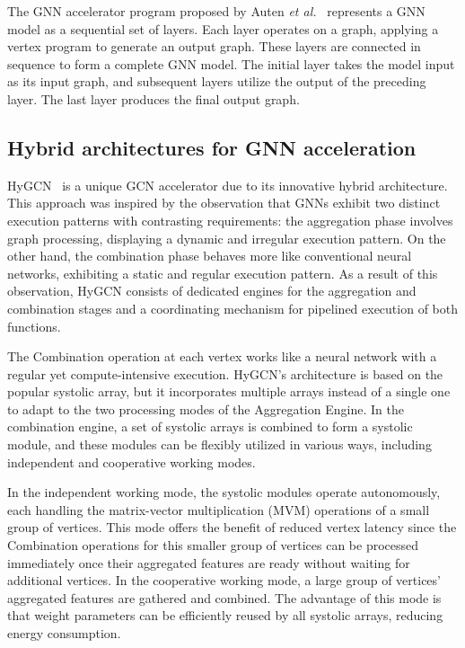 The GNN accelerator program proposed by Auten \textit{et al.}~\cite{9218751} represents a GNN model as a sequential set of layers.
Each layer operates on a graph, applying a vertex program to generate an output graph.
These layers are connected in sequence to form a complete GNN model.
The initial layer takes the model input as its input graph, and subsequent layers utilize the output of the preceding layer.
The last layer produces the final output graph.

\subsection{Hybrid architectures for GNN acceleration}
\label{subsec:hybrid-architectures}%

HyGCN~\cite{DBLP:journals/corr/abs-2001-02514} is a unique GCN accelerator due to its innovative hybrid architecture.
This approach was inspired by the observation that GNNs exhibit two distinct execution patterns with contrasting requirements: the aggregation phase involves graph processing, displaying a dynamic and irregular execution pattern.
On the other hand, the combination phase behaves more like conventional neural networks, exhibiting a static and regular execution pattern.
As a result of this observation, HyGCN consists of dedicated engines for the aggregation and combination stages and a coordinating mechanism for pipelined execution of both functions.

The Combination operation at each vertex works like a neural network with a regular yet compute-intensive execution.
HyGCN's architecture is based on the popular systolic array, but it incorporates multiple arrays instead of a single one to adapt to the two processing modes of the Aggregation Engine.
In the combination engine, a set of systolic arrays is combined to form a systolic module, and these modules can be flexibly utilized in various ways, including independent and cooperative working modes.

In the independent working mode, the systolic modules operate autonomously, each handling the matrix-vector multiplication (MVM) operations of a small group of vertices.
This mode offers the benefit of reduced vertex latency since the Combination operations for this smaller group of vertices can be processed immediately once their aggregated features are ready without waiting for additional vertices.
In the cooperative working mode, a large group of vertices' aggregated features are gathered and combined.
The advantage of this mode is that weight parameters can be efficiently reused by all systolic arrays, reducing energy consumption.


